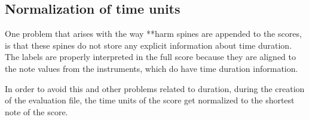   \subsection{Normalization of time units}

		One problem that arises with the way **harm spines are appended to the scores, is that these spines do not store any explicit information about time duration. The labels are properly interpreted in the full score because they are aligned to the note values from the instruments, which do have time duration information.

		In order to avoid this and other problems related to duration, during the creation of the evaluation file, the time units of the score get normalized to the shortest note of the score.

